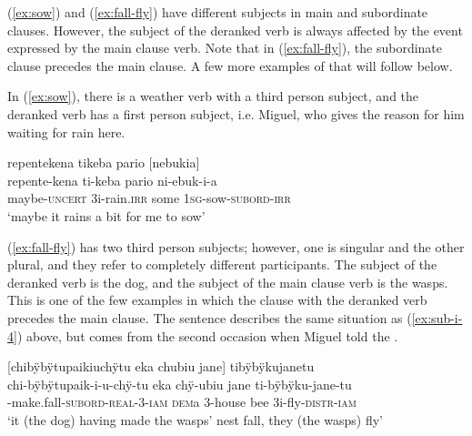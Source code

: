 (\ref{ex:sow}) and (\ref{ex:fall-fly}) have different subjects in main and subordinate clauses. However, the subject of the deranked verb is always affected by the event expressed by the main clause verb. Note that in (\ref{ex:fall-fly}), the subordinate clause precedes the main clause. A few more examples of that will follow below.


In (\ref{ex:sow}), there is a weather verb with a third person subject, and the deranked verb has a first person subject, i.e. Miguel, who gives the reason for him waiting for rain here.

\ea\label{ex:sow}
\begingl
\glpreamble repentekena tikeba pario \textup{[}nebukia\textup{]}\\
\gla repente-kena ti-keba pario ni-ebuk-i-a\\
\glb maybe-\textsc{uncert} 3i-rain.\textsc{irr} some 1\textsc{sg}-sow-\textsc{subord}-\textsc{irr} \\
\glft ‘maybe it rains a bit for me to sow’
\endgl
\trailingcitation{[mqx-p110826l.616]}
\xe

(\ref{ex:fall-fly}) has two third person subjects; however, one is singular and the other plural, and they refer to completely different participants. The subject of the deranked verb is the dog, and the subject of the main clause verb is the wasps. This is one of the few examples in which the clause with the deranked verb precedes the main clause. The sentence describes the same situation as (\ref{ex:sub-i-4}) above, but comes from the second occasion when Miguel told the .

\ea\label{ex:fall-fly}
\begingl
\glpreamble \textup{[}chibÿbÿtupaikiuchÿtu eka chubiu jane\textup{]} tibÿbÿkujanetu\\
\gla chi-bÿbÿtupaik-i-u-chÿ-tu eka chÿ-ubiu jane ti-bÿbÿku-jane-tu\\
-make.fall-\textsc{subord}-\textsc{real}-3-\textsc{iam} \textsc{dem}a 3-house bee 3i-fly-\textsc{distr}-\textsc{iam}\\
\glft ‘it (the dog) having made the wasps’ nest fall, they (the wasps) fly’
\endgl
\trailingcitation{[mox-a110920l-2.080]}
\xe

